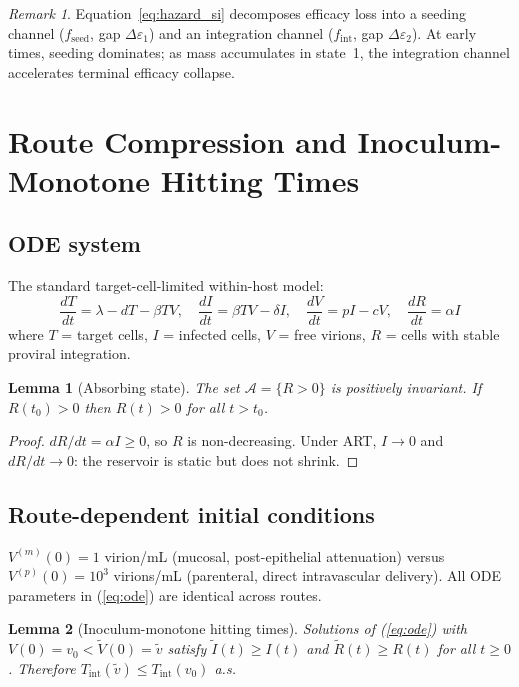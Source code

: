 \documentclass[11pt]{article}
\newtheorem{lemma}{Lemma}[section]
\theoremstyle{definition}
\theoremstyle{remark}
\newtheorem*{remark}{Remark}
\newcommand{\Tint}{T_{\text{int}}}
\begin{document}
\begin{remark}
Equation~\ref{eq:hazard_si} decomposes efficacy loss into a seeding channel ($f_{\text{seed}}$, gap $\Delta\varepsilon_{1}$) and an integration channel ($f_{\text{int}}$, gap $\Delta\varepsilon_{2}$). At early times, seeding dominates; as mass accumulates in state~1, the integration channel accelerates terminal efficacy collapse.
\end{remark}


\section{Route Compression and Inoculum-Monotone Hitting Times}

\subsection{ODE system}

The standard target-cell-limited within-host model:
\begin{equation}
\frac{dT}{dt} = \lambda - dT - \beta TV, \quad
\frac{dI}{dt} = \beta TV - \delta I, \quad
\frac{dV}{dt} = pI - cV, \quad
\frac{dR}{dt} = \alpha I
\label{eq:ode}
\end{equation}
where $T$ = target cells, $I$ = infected cells, $V$ = free virions, $R$ = cells with stable proviral integration.

\begin{lemma}[Absorbing state]\label{lem:absorb}
The set $\mathcal{A} = \{R > 0\}$ is positively invariant. If $R(t_{0}) > 0$ then $R(t) > 0$ for all $t > t_{0}$.
\end{lemma}

\begin{proof}
$dR/dt = \alpha I \geq 0$, so $R$ is non-decreasing. Under ART, $I \to 0$ and $dR/dt \to 0$: the reservoir is static but does not shrink.
\end{proof}

\subsection{Route-dependent initial conditions}

$V^{(m)}(0) = 1$ virion/mL (mucosal, post-epithelial attenuation) versus $V^{(p)}(0) = 10^{3}$ virions/mL (parenteral, direct intravascular delivery). All ODE parameters in (\ref{eq:ode}) are identical across routes.

\begin{lemma}[Inoculum-monotone hitting times]\label{lem:monotone}
Solutions of (\ref{eq:ode}) with $V(0) = v_{0} < \tilde{V}(0) = \tilde{v}$ satisfy $\tilde{I}(t) \geq I(t)$ and $\tilde{R}(t) \geq R(t)$ for all $t \geq 0$. Therefore $\Tint(\tilde{v}) \leq \Tint(v_{0})$ a.s.
\end{lemma}
\end{document}
